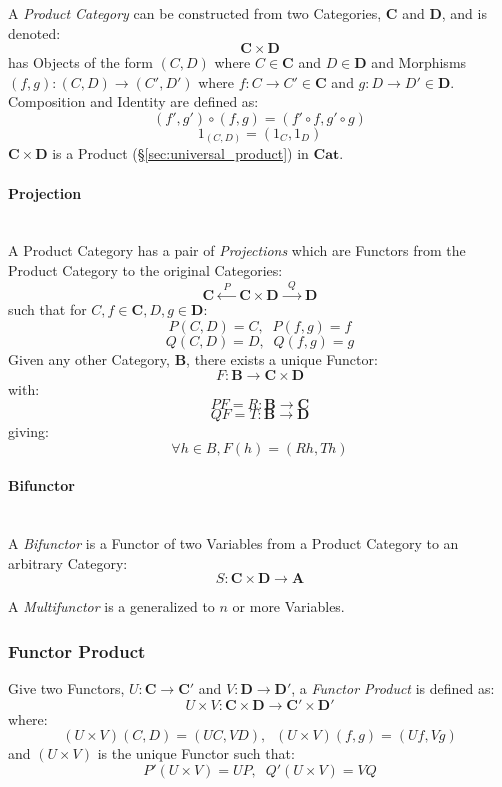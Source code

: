 A \emph{Product Category} can be constructed from two Categories,
$\mathbf{C}$ and $\mathbf{D}$, and is denoted:
\[
    \mathbf{C} \times \mathbf{D}
\]
has Objects of the form $(C,D)$ where $C \in \mathbf{C}$ and $D \in
\mathbf{D}$ and Morphisms $(f,g) : (C,D) \rightarrow (C',D')$ where $f
: C \rightarrow C' \in \mathbf{C}$ and $g : D \rightarrow D' \in
\mathbf{D}$. Composition and Identity are defined as:
\[
    (f',g') \circ (f,g) = (f' \circ f,g' \circ g)
\]\[
    1_{(C,D)} = (1_C, 1_D)
\]
$\mathbf{C} \times \mathbf{D}$ is a Product
(\S\ref{sec:universal_product}) in $\mathbf{Cat}$.



\paragraph{Projection}\label{sec:projection_functor}
\hfill \\
A Product Category has a pair of \emph{Projections} which are Functors
from the Product Category to the original Categories:
\[
    \mathbf{C} \xleftarrow{\;\; P\;\;} \mathbf{C}\times\mathbf{D}
    \xrightarrow{\;\; Q\;\;} \mathbf{D}
\]
such that for $C,f \in \mathbf{C}, D,g \in \mathbf{D}$:
\[
    P(C,D) = C, \;\; P(f,g) = f
\]\[
    Q(C,D) = D, \;\; Q(f,g) = g
\]
Given any other Category, $\mathbf{B}$, there exists a unique Functor:
\[
    F : \mathbf{B} \rightarrow \mathbf{C} \times \mathbf{D}
\]
with:
\[
    PF = R : \mathbf{B} \rightarrow \mathbf{C}
\]\[
    QF = T : \mathbf{B} \rightarrow \mathbf{D}
\]
giving:
\[
    \forall h \in B, F(h) = (Rh,Th)
\]



\paragraph{Bifunctor}\label{sec:bifunctor}
\hfill \\

A \emph{Bifunctor} is a Functor of two Variables from a Product
Category to an arbitrary Category:
\[
    S : \mathbf{C} \times \mathbf{D} \rightarrow \mathbf{A}
\]

A \emph{Multifunctor} is a generalized to $n$ or more Variables.



\subsubsection{Functor Product}\label{sec:functor_product}

Give two Functors, $U : \mathbf{C} \rightarrow \mathbf{C'}$ and $V :
\mathbf{D} \rightarrow \mathbf{D'}$, a \emph{Functor Product} is
defined as:
\[
    U \times V : \mathbf{C} \times \mathbf{D}
    \rightarrow \mathbf{C'} \times \mathbf{D'}
\]
where:
\[
    (U \times V)(C,D) = (UC,VD), \;\; (U \times V)(f,g) = (Uf,Vg)
\]
and $(U \times V)$ is the unique Functor such that:
\[
    P'(U \times V) = UP, \;\; Q'(U \times V) = VQ
\]



